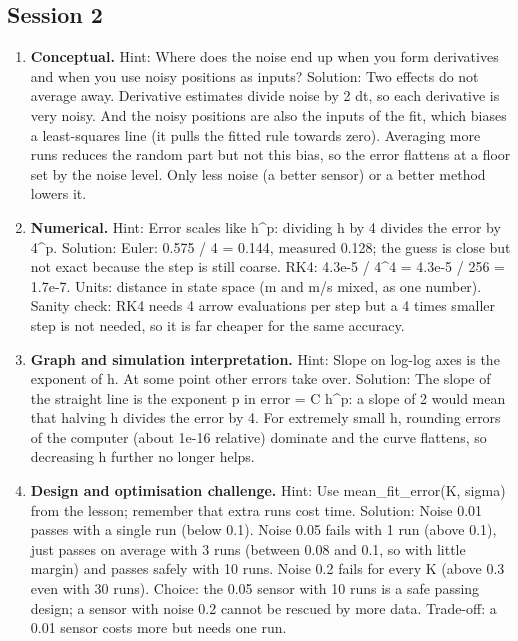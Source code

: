 \documentclass[11pt,a4paper]{article}
\begin{document}
\subsection*{Session 2}
\begin{enumerate}[nosep]
\item \textbf{Conceptual.} Hint: Where does the noise end up when you form derivatives and when you use noisy positions as inputs? Solution: Two effects do not average away. Derivative estimates divide noise by 2 dt, so each derivative is very noisy. And the noisy positions are also the inputs of the fit, which biases a least-squares line (it pulls the fitted rule towards zero). Averaging more runs reduces the random part but not this bias, so the error flattens at a floor set by the noise level. Only less noise (a better sensor) or a better method lowers it.
\item \textbf{Numerical.} Hint: Error scales like h\textasciicircum{}p: dividing h by 4 divides the error by 4\textasciicircum{}p. Solution: Euler: 0.575 / 4 = 0.144, measured 0.128; the guess is close but not exact because the step is still coarse. RK4: 4.3e-5 / 4\textasciicircum{}4 = 4.3e-5 / 256 = 1.7e-7. Units: distance in state space (m and m/s mixed, as one number). Sanity check: RK4 needs 4 arrow evaluations per step but a 4 times smaller step is not needed, so it is far cheaper for the same accuracy.
\item \textbf{Graph and simulation interpretation.} Hint: Slope on log-log axes is the exponent of h. At some point other errors take over. Solution: The slope of the straight line is the exponent p in error = C h\textasciicircum{}p: a slope of 2 would mean that halving h divides the error by 4. For extremely small h, rounding errors of the computer (about 1e-16 relative) dominate and the curve flattens, so decreasing h further no longer helps.
\item \textbf{Design and optimisation challenge.} Hint: Use mean\_fit\_error(K, sigma) from the lesson; remember that extra runs cost time. Solution: Noise 0.01 passes with a single run (below 0.1). Noise 0.05 fails with 1 run (above 0.1), just passes on average with 3 runs (between 0.08 and 0.1, so with little margin) and passes safely with 10 runs. Noise 0.2 fails for every K (above 0.3 even with 30 runs). Choice: the 0.05 sensor with 10 runs is a safe passing design; a sensor with noise 0.2 cannot be rescued by more data. Trade-off: a 0.01 sensor costs more but needs one run.
\end{enumerate}
\end{document}
